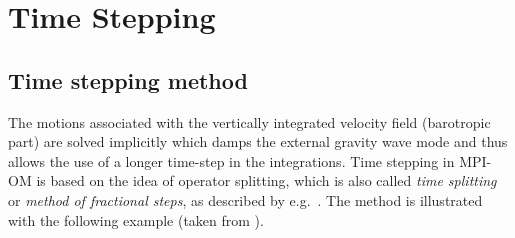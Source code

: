 %
%



\thispagestyle{empty}
 
\chapter[Time Stepping]
{\Large{\bf Time Stepping}\label{ch:timestepping}}


\section{Time stepping method}
\label{ch:timestepping:method}


The motions associated with the vertically integrated velocity field (barotropic
part) are solved implicitly which  damps the external
gravity wave mode and thus allows the use of  a longer time-step in the integrations.
Time stepping in MPI-OM is based on the idea of operator splitting, which
is also called {\sl time splitting} or {\sl method of fractional steps},
as described by e.g.\ \citet{press88}. 
The method is illustrated with the following example (taken from \citet{press88}).

